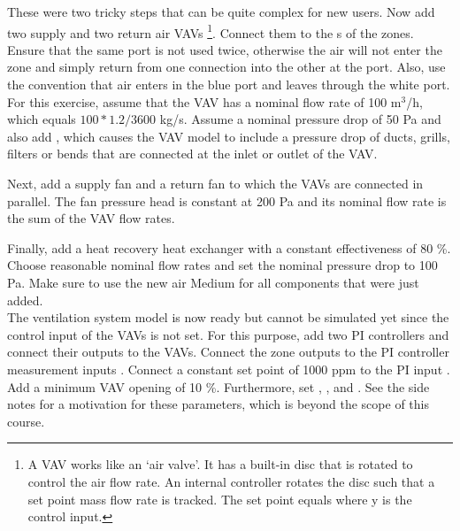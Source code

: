 \documentclass[10pt,a4paper]{article}
\begin{document}
These were two tricky steps that can be quite complex for new users. 
Now add two supply and two return air VAVs
\footnote{A VAV works like an `air valve'. It has a built-in disc that is rotated to control the 
air flow rate. An internal controller rotates the disc such that a set point mass flow rate is tracked.
The set point equals  where y is the control input.}.
Connect them to the s of the zones. 
Ensure that the same port is not used twice, otherwise
the air will not enter the zone and simply return from one 
connection into the other at the port.
Also, use the convention that air enters in the blue port and leaves
through the white port.
For this exercise, assume that the VAV has a nominal flow rate of 100 m$^3$/h,
which equals $100*1.2/3600$ kg/s.
Assume a nominal pressure drop of 50 Pa and
also add , which causes the VAV
model to include a pressure drop of ducts, grills, filters or bends that are connected
at the inlet or outlet of the VAV.

Next, add a supply fan and a return fan to which the VAVs
are connected in parallel. The fan pressure head is constant at 200 Pa
and its nominal flow rate is the sum of the VAV flow rates.

Finally, add a heat recovery heat exchanger with a constant effectiveness of 80 \%.
Choose reasonable nominal flow rates and set the nominal pressure drop to 100 Pa.
Make sure to use the new air Medium for all components that were just added.\\

The ventilation system model is now ready but cannot be simulated yet since
the control input of the VAVs is not set.
For this purpose, add two PI controllers and connect their outputs to the VAVs.
Connect the zone  outputs to the PI controller measurement inputs .
Connect a constant set point of 1000 ppm to the PI input .
Add a minimum VAV opening of 10 \%.
Furthermore, set ,  ,  and . 
See the side notes for a motivation for these parameters, 
which is beyond the scope of this course.
\end{document}

